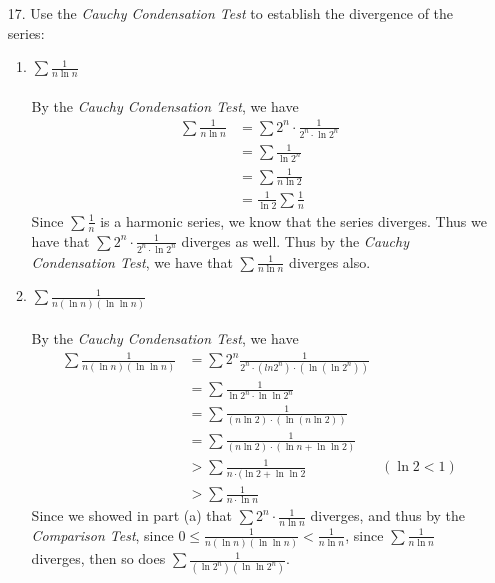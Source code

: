 \documentclass[12pt,letterpaper]{article}
\theoremstyle{case}
\theoremstyle{definition}
\begin{document}
\begin{enumerate}
\begin{enumerate}
			\item[17.] Use the \textit{Cauchy Condensation Test} to establish the divergence of the series:
			\begin{enumerate}
				\item $\displaystyle\sum \frac{1}{n \ln n}$
				\\\\By the \textit{Cauchy Condensation Test}, we have
				\begin{align*}
					\sum \frac{1}{n \ln n} &= \sum 2^n \cdot \frac{1}{2^n \cdot \ln 2^n} \\
					&= \sum \frac{1}{\ln 2^n} \\
					&= \sum \frac{1}{n \ln 2} \\
					&= \frac{1}{\ln 2} \sum \frac{1}{n}
				\end{align*}
				Since $\sum \frac{1}{n}$ is a harmonic series, we know that the series diverges. Thus we have that $\sum 2^n \cdot \frac{1}{2^n \cdot \ln 2^n}$ diverges as well. Thus by the \textit{Cauchy Condensation Test}, we have that $\sum \frac{1}{n \ln n}$ diverges also.\\
				
				\item $\displaystyle\sum \frac{1}{n(\ln n)(\ln\ln n)}$
				\\\\By the \textit{Cauchy Condensation Test}, we have
				\begin{align*}
					\sum \frac{1}{n (\ln n)(\ln \ln n)} &= \sum 2^n \frac{1}{2^n\cdot (ln 2^n) \cdot (\ln (\ln 2^n))} \\
					&= \sum \frac{1}{\ln 2^n \cdot \ln \ln 2^n} \\
					&= \sum \frac{1}{(n \ln 2) \cdot (\ln (n \ln 2))} \\
					&= \sum \frac{1}{(n \ln 2) \cdot (\ln n+\ln\ln 2)} \\
					&> \sum \frac{1}{n \cdot (\ln 2 + \ln \ln 2} &(\ln 2 < 1) \\
					&> \sum \frac{1}{n \cdot \ln n}
				\end{align*}
				Since we showed in part (a) that $\sum 2^n \cdot \frac{1}{n \ln n}$ diverges, and thus by the \textit{Comparison Test}, since $0 \leq \frac{1}{n(\ln n)(\ln\ln n)} < \frac{1}{n \ln n}$, since $\sum \frac{1}{n \ln n}$ diverges, then so does $\sum \frac{1}{(\ln 2^n)(\ln\ln 2^n)}$.\\
			\end{enumerate}
		\end{enumerate}
	

\end{enumerate}
\end{document}
